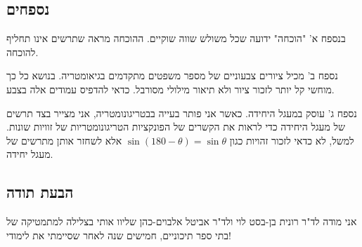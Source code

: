 \vspace{-3ex}


\subsection*{נספחים}

בנספח א' "הוכחה" ידועה שכל משולש שווה שוקיים. ההוכחה מראה שתרשים אינו תחליף להוכחה.

נספח ב' מכיל ציורים צבעוניים של מספר משפטים מתקדמים בגיאומטריה. בנושא כל כך מוחשי קל יותר לזכור ציור ולא תיאור מילולי מסורבל. כדאי להדפיס עמודים אלה בצבע.

נספח ג' עוסק במעגל היחידה. כאשר אני פותר בעייה בבטריגונומטריה, אני מצייר בצד תרשים של מעגל היחידה כדי לראות את הקשרים של הפונקציות  הטריגונומטריות של זוויות שונות.  למשל, לא כדאי לזכור זהויות כגון
$\sin (180\!-\!\theta)=\sin \theta$
אלא לשחזר אותן מתרשים של מעגל יחידה.

\subsection*{הבעת תודה}

אני מודה לד"ר רונית בן-בסט לוי ולד"ר אביטל אלבוים-כהן שליוו אותי בצלילה למתמטיקה של בתי ספר תיכוניים, חמישים שנה לאחר שסיימתי את לימודי!

\np

